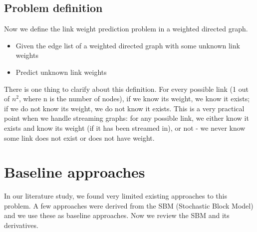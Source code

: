 \documentclass[letterpaper]{article}
\begin{document}
\subsection{Problem definition}
Now we define the link weight prediction problem in a weighted directed graph.
\begin{itemize}
	\item Given the edge list of a weighted directed graph with some unknown link weights
	\item Predict unknown link weights
\end{itemize}
There is one thing to clarify about this definition.
For every possible link (1 out of $ n^2 $, where n is the number of nodes), 
if we know its weight, we know it exists;
if we do not know its weight, we do not know it exists.
This is a very practical point when we handle streaming graphs:
for any possible link,
we either know it exists and know its weight (if it has been streamed in), or not - we never know some link does not exist or does not have weight.

\section{Baseline approaches}
In our literature study, we found very limited existing approaches to this problem.
A few approaches were derived from the SBM (Stochastic Block Model) \cite{aicher2014learning} and we use these as baseline approaches.
Now we review the SBM and its derivatives.
\end{document}
